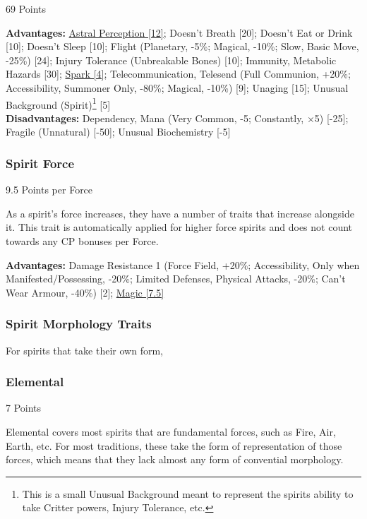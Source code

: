 \begin{multicols*}{3}
	\begin{flushright}
		69 Points
	\end{flushright}
	\textbf{Advantages:} 
	\hyperref[astral_perception]{Astral Perception [12]}; Doesn't Breath [20]; Doesn't Eat or Drink [10]; Doesn't Sleep [10]; Flight (Planetary, -5\%; Magical, -10\%; Slow, Basic Move, -25\%) [24]; Injury Tolerance (Unbreakable Bones) [10]; Immunity, Metabolic Hazards [30]; \hyperref[spark]{Spark [4]}; Telecommunication, Telesend (Full Communion, +20\%; Accessibility, Summoner Only, -80\%; Magical, -10\%) [9]; Unaging [15]; Unusual Background (Spirit)\footnote{This is a small Unusual Background meant to represent the spirits ability to take Critter powers, Injury Tolerance, etc.} [5]
	\\\textbf{Disadvantages:} 
	Dependency, Mana (Very Common, -5; Constantly, \(\times\)5) [-25]; Fragile (Unnatural) [-50]; Unusual Biochemistry [-5]
	
	\subsubsection{Spirit Force}\label{spirit_force}
	\begin{flushright}
		9.5 Points per Force
	\end{flushright}
	
	As a spirit's force increases, they have a number of traits that increase alongside it. This trait is automatically applied for higher force spirits and does not count towards any CP bonuses per Force.
	
	\textbf{Advantages:}
	Damage Resistance 1 (Force Field, +20\%; Accessibility, Only when Manifested/Possessing, -20\%; Limited Defenses, Physical Attacks, -20\%; Can't Wear Armour, -40\%) [2]; \hyperref[magic]{Magic [7.5]}
	
	\subsubsection{Spirit Morphology Traits}
	
	For spirits that take their own form, 
	
	\subsubsection*{Elemental}\label{elemental}
	\begin{flushright}
		7 Points
	\end{flushright}
	
	Elemental covers most spirits that are fundamental forces, such as Fire, Air, Earth, etc. For most traditions, these take the form of representation of those forces, which means that they lack almost any form of convential morphology.
	

\end{multicols*}
